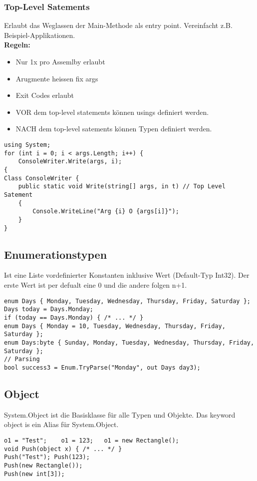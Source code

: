 \subsubsection{Top-Level Satements}
Erlaubt das Weglassen der Main-Methode als entry point. Vereinfacht z.B. Beispiel-Applikationen. \\
\textbf{Regeln:}
\begin{itemize}
  \itemsep -0.5em 
  \item Nur 1x pro Assemlby erlaubt
  \item Arugmente heissen fix args
  \item Exit Codes erlaubt
  \item VOR dem top-level statements können usings definiert werden.
  \item NACH dem top-level satements können Typen definiert werden.
\end{itemize}

\begin{lstlisting}
using System;
for (int i = 0; i < args.Length; i++) {
	ConsoleWriter.Write(args, i);
{
Class ConsoleWriter {
	public static void Write(string[] args, in t) // Top Level Satement
	{
		Console.WriteLine("Arg {i} O {args[i]}");
	}
}
\end{lstlisting}

\subsection{Enumerationstypen}
Ist eine Liste vordefinierter Konstanten inklusive Wert (Default-Typ Int32). Der erste Wert ist per defualt eine 0 und die andere folgen n+1.
\begin{lstlisting}
enum Days { Monday, Tuesday, Wednesday, Thursday, Friday, Saturday };
Days today = Days.Monday;
if (today == Days.Monday) { /* ... */ }
enum Days { Monday = 10, Tuesday, Wednesday, Thursday, Friday, Saturday };
enum Days:byte { Sunday, Monday, Tuesday, Wednesday, Thursday, Friday, Saturday };
// Parsing
bool success3 = Enum.TryParse("Monday", out Days day3);
\end{lstlisting}

\subsection{Object}
System.Object ist die Basisklasse für alle Typen und Objekte. Das keyword object is ein Alias für System.Object. 

\begin{lstlisting}
o1 = "Test";	o1 = 123;	o1 = new Rectangle();
void Push(object x) { /* ... */ }
Push("Test"); Push(123);
Push(new Rectangle());
Push(new int[3]);
\end{lstlisting}

